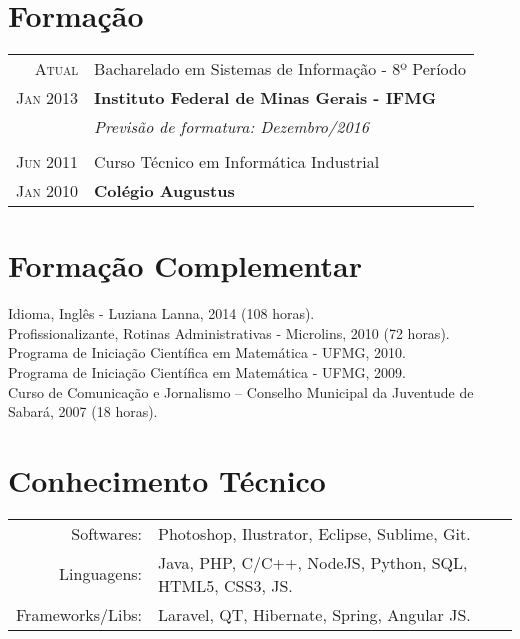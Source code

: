 \documentclass[a4paper,10pt]{article}
\begin{document}
\section{Formação}
\begin{tabular}{r|p{11cm}}
	\textsc{Atual} & Bacharelado em Sistemas de Informação - 8º Período\\
	\textsc{Jan 2013} & \textbf{Instituto Federal de Minas Gerais - IFMG}\\
	&\small\emph{Previsão de formatura: Dezembro/2016}\\
	\multicolumn{2}{c}{} \\
	\textsc{Jun 2011}& Curso Técnico em Informática Industrial \\
	\textsc{Jan 2010}& \textbf{Colégio Augustus}
\end{tabular}

\section{Formação Complementar}
Idioma, Inglês - Luziana Lanna, \textsc{2014} (108 horas).\\
Profissionalizante, Rotinas Administrativas - Microlins, \textsc{2010} (72 horas).\\
Programa de Iniciação Científica em Matemática - UFMG, 2010.\\
Programa de Iniciação Científica em Matemática - UFMG, 2009.\\
Curso de Comunicação e Jornalismo – Conselho Municipal da Juventude de Sabará, 2007 (18 horas).

\section{Conhecimento Técnico}
\begin{tabular}{rl}
	Softwares: & Photoshop, Ilustrator, Eclipse, Sublime, Git.\\
	Linguagens: & Java, PHP, C/C++, NodeJS, Python, SQL, HTML5, CSS3, JS.\\
	Frameworks/Libs: & Laravel, QT, Hibernate, Spring, Angular JS.\\
\end{tabular}
\end{document}

